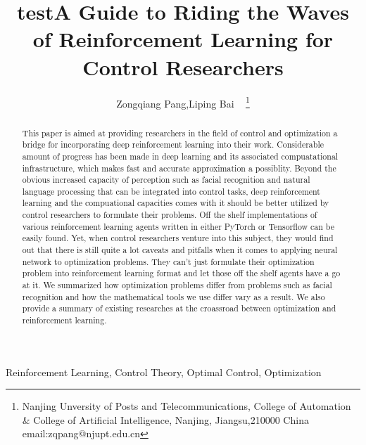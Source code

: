 \documentclass[journal]{IEEEtran}
\begin{document}
    \title{test}
\title{A Guide to Riding the Waves of Reinforcement Learning for Control Researchers}
\author{ Zongqiang Pang,Liping Bai ~ \thanks{Nanjing Unversity of Posts and Telecommunications, College of Automation \& College of Artificial Intelligence, Nanjing, Jiangsu,210000 China email:zqpang@njupt.edu.cn}}
\maketitle
\begin{abstract}
This paper is aimed at providing researchers in the field of control and optimization a bridge for incorporating deep reinforcement learning into their work. Considerable amount of progress has been made in deep learning and its associated compuatational infrastructure, which makes fast and accurate approximation a possiblity. Beyond the obvious increased capacity of perception such as facial recognition and natural language processing that can be integrated into control tasks, deep reinforcement learning and the compuational capacities comes with it should be better utilized by control researchers to formulate their problems. Off the shelf implementations of various reinforcement learning agents written in either PyTorch or Tensorflow can be easily found. Yet, when control researchers venture into this subject, they would find out that there is still quite a lot caveats and pitfalls when it comes to applying neural network to optimization problems. They can't just formulate their optimization problem into reinforcement learning format and let those off the shelf agents have a go at it. We summarized how optimization problems differ from problems such as facial recognition and how the mathematical tools we use differ vary as a result. We also provide a summary of existing researches at the croassroad between optimization and reinforcement learning.
\end{abstract}
\begin{IEEEkeywords}
Reinforcement Learning, Control Theory, Optimal Control, Optimization
\end{IEEEkeywords}
%
\IEEEpeerreviewmaketitle
\end{document}
